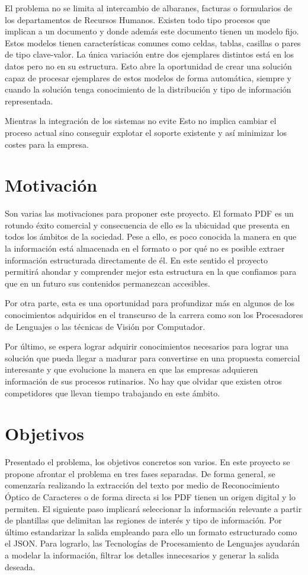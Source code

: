 El problema no se limita al intercambio de albaranes, facturas o formularios de los departamentos de Recursos Humanos. Existen todo tipo procesos que implican a un documento y donde además este documento tienen un modelo fijo. Estos modelos tienen características comunes como celdas, tablas, casillas o pares de tipo clave-valor. La única variación entre dos ejemplares distintos está en los datos pero no en su estructura. Esto abre la oportunidad de crear una solución capaz de procesar ejemplares de estos modelos de forma automática, siempre y cuando la solución tenga conocimiento de la distribución y tipo de información representada. 

Mientras la integración de los sistemas no evite Esto no implica cambiar el proceso actual sino conseguir explotar el soporte existente y así minimizar los costes para la empresa. 

\section{Motivación}

Son varias las motivaciones para proponer este proyecto. El formato PDF es un rotundo éxito comercial y consecuencia de ello es la ubicuidad que presenta en todos los ámbitos de la sociedad. Pese a ello, es poco conocida la manera en que la información está almacenada en el formato o por qué no es posible extraer información estructurada directamente de él. En este sentido el proyecto permitirá ahondar y comprender mejor esta estructura en la que confiamos para que en un futuro sus contenidos permanezcan accesibles.

Por otra parte, esta es una oportunidad para profundizar más en algunos de los conocimientos adquiridos en el transcurso de la carrera como son los Procesadores de Lenguajes o las técnicas de Visión por Computador.

Por último, se espera lograr adquirir conocimientos necesarios para lograr una solución que pueda llegar a madurar para convertirse en una propuesta comercial interesante y que evolucione la manera en que las empresas adquieren información de sus procesos rutinarios. No hay que olvidar que existen otros competidores que llevan tiempo trabajando en este ámbito.

\section{Objetivos} 

Presentado el problema, los objetivos concretos son varios. En este proyecto se propone afrontar el problema en tres fases separadas. De forma general, se comenzaría realizando la extracción del texto por medio de Reconocimiento Óptico de Caracteres o de forma directa si los PDF tienen un origen digital y lo permiten. El siguiente paso implicará seleccionar la información relevante a partir de plantillas que delimitan las regiones de interés y tipo de información. Por último estandarizar la salida empleando para ello un formato estructurado como el JSON. Para lograrlo, las Tecnologías de Procesamiento de Lenguajes ayudarán a modelar la información, filtrar los detalles innecesarios y generar la salida deseada.

